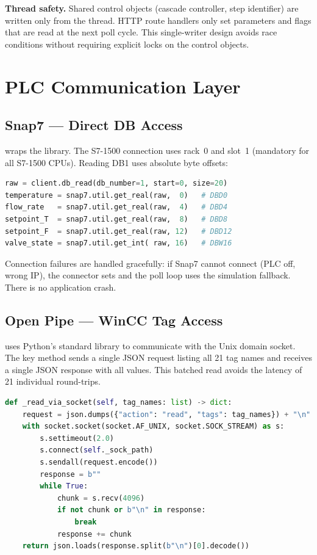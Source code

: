 \textbf{Thread safety.}
Shared control objects (cascade controller, step identifier) are written only from the
 thread. HTTP route handlers only set parameters and flags that are
read at the next poll cycle. This single-writer design avoids race conditions without
requiring explicit locks on the control objects.

\section{PLC Communication Layer}

\subsection{Snap7 --- Direct DB Access}

 wraps the  library. The S7-1500 connection
uses rack~0 and slot~1 (mandatory for all S7-1500 CPUs). Reading DB1 uses absolute byte
offsets:

\begin{lstlisting}[language=Python, caption={Snap7 DB1 read in \texttt{plc\_connector.py}.}]
raw = client.db_read(db_number=1, start=0, size=20)
temperature = snap7.util.get_real(raw,  0)   # DBD0
flow_rate   = snap7.util.get_real(raw,  4)   # DBD4
setpoint_T  = snap7.util.get_real(raw,  8)   # DBD8
setpoint_F  = snap7.util.get_real(raw, 12)   # DBD12
valve_state = snap7.util.get_int( raw, 16)   # DBW16
\end{lstlisting}

Connection failures are handled gracefully: if Snap7 cannot connect (PLC off, wrong IP),
the connector sets  and the poll loop uses the simulation
fallback. There is no application crash.

\subsection{Open Pipe --- WinCC Tag Access}

 uses Python's standard  library to communicate
with the Unix domain socket. The key method  sends a single JSON
request listing all 21 tag names and receives a single JSON response with all values.
This batched read avoids the latency of 21 individual round-trips.

\begin{lstlisting}[language=Python,
  caption={Open Pipe batch read in \texttt{openpipe\_connector.py}.}]
def _read_via_socket(self, tag_names: list) -> dict:
    request = json.dumps({"action": "read", "tags": tag_names}) + "\n"
    with socket.socket(socket.AF_UNIX, socket.SOCK_STREAM) as s:
        s.settimeout(2.0)
        s.connect(self._sock_path)
        s.sendall(request.encode())
        response = b""
        while True:
            chunk = s.recv(4096)
            if not chunk or b"\n" in response:
                break
            response += chunk
    return json.loads(response.split(b"\n")[0].decode())
\end{lstlisting}

